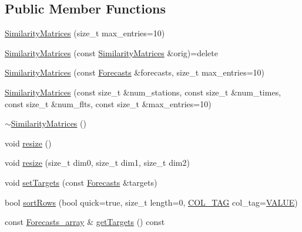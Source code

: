 \subsection*{Public Member Functions}
\begin{DoxyCompactItemize}
\item 
\mbox{\hyperlink{class_similarity_matrices_a7134e1115c8c594b6786a31a3b4323a6}{Similarity\+Matrices}} (size\+\_\+t max\+\_\+entries=10)
\item 
\mbox{\hyperlink{class_similarity_matrices_a915fa9a5b1906a6e48a102be543de8b2}{Similarity\+Matrices}} (const \mbox{\hyperlink{class_similarity_matrices}{Similarity\+Matrices}} \&orig)=delete
\item 
\mbox{\hyperlink{class_similarity_matrices_a05b1fda9d2ce734329de609310ec100b}{Similarity\+Matrices}} (const \mbox{\hyperlink{class_forecasts}{Forecasts}} \&forecasts, size\+\_\+t max\+\_\+entries=10)
\item 
\mbox{\hyperlink{class_similarity_matrices_a5ea02e3aad08277c862accea5e5eccd8}{Similarity\+Matrices}} (const size\+\_\+t \&num\+\_\+stations, const size\+\_\+t \&num\+\_\+times, const size\+\_\+t \&num\+\_\+flts, const size\+\_\+t \&max\+\_\+entries=10)
\item 
\mbox{\hyperlink{class_similarity_matrices_a255b73355331573de8e038b9f1c28b6b}{$\sim$\+Similarity\+Matrices}} ()
\item 
void \mbox{\hyperlink{class_similarity_matrices_afc8b529a0d1bed232c63b6c96a1432dd}{resize}} ()
\item 
void \mbox{\hyperlink{class_similarity_matrices_a6fd85de464f978b2767f907df5f95513}{resize}} (size\+\_\+t dim0, size\+\_\+t dim1, size\+\_\+t dim2)
\item 
void \mbox{\hyperlink{class_similarity_matrices_a639c9702983460a7c0b443f3da7b18f4}{set\+Targets}} (const \mbox{\hyperlink{class_forecasts}{Forecasts}} \&targets)
\item 
bool \mbox{\hyperlink{class_similarity_matrices_a784407b5eee0d0436c03bf55f214160c}{sort\+Rows}} (bool quick=true, size\+\_\+t length=0, \mbox{\hyperlink{class_similarity_matrices_a8fea56a2e7c8a9f692753c8f706e5706}{C\+O\+L\+\_\+\+T\+AG}} col\+\_\+tag=\mbox{\hyperlink{class_similarity_matrices_a8fea56a2e7c8a9f692753c8f706e5706a7e2e95a0186387323e96d06c26d90280}{V\+A\+L\+UE}})
\item 
const \mbox{\hyperlink{class_forecasts__array}{Forecasts\+\_\+array}} \& \mbox{\hyperlink{class_similarity_matrices_a17f864e7a279029be249e5f0d3abb9e6}{get\+Targets}} () const
\item 

\end{DoxyCompactItemize}
